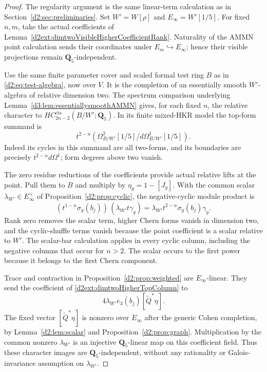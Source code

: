 \begin{proof}
The regularity argument is the same linear-term calculation as in
Section~\ref{d2:sec:preliminaries}.
Set $W'=W[\rho]$ and $E_\infty=W'[1/5]$.
For fixed $n,m$, take the actual coefficients of
Lemma~\ref{d2ext:dimtwoVisibleHigherCoefficientRank}.
Naturality of the AMMN point calculation sends their coordinates
under $E_m\hookrightarrow E_\infty$; hence their visible
projections remain $\mathbf Q_5$-independent.

Use the same finite parameter cover and scaled formal test ring
$B$ as in \eqref{d2:eq:test-algebra}, now over $V$.
It is the completion of an essentially smooth $W'$-algebra
of relative dimension two.  The spectrum comparison underlying
Lemma~\ref{d3:lem:essentiallysmoothAMMN} gives, for each fixed $n$,
the relative character to $HC_{2n-2}^{\mathrm{cts}}(B/W';\mathbf Q_5)$.
In its finite mixed-HKR model the top-form summand is
\begin{equation}
\label{d2ext:dimtwoHigherTopColumn}
 t^{2-n}\left(
 \Omega^2_{B/W'}[1/5]/d\Omega^1_{B/W'}[1/5]\right).
\end{equation}
Indeed its cycles in this summand are all two-forms, and its
boundaries are precisely $t^{2-n}d\Omega^1$; form degrees above
two vanish.

The zero residue reductions of the coefficients provide actual
relative lifts at the point. Pull them to $B$ and multiply by
$\eta_g=1-[J_g]$.
With the common scalar $\lambda_{W'}\in E_\infty^\times$ of
Proposition~\ref{d2:prop:cyclic}, the negative-cyclic module product is
\[
 (t^{1-n}\sigma_g(b_j))\,(\lambda_{W'}t\gamma_g)
       =\lambda_{W'}t^{2-n}\sigma_g(b_j)\gamma_g.
\]
Rank zero removes the scalar term, higher Chern forms vanish in
dimension two, and the cyclic-shuffle terms vanish because the
point coefficient is a scalar relative to $W'$.
The scalar-bar calculation applies in every cyclic column, including
the negative columns that occur for $n>2$.
The scalar occurs to the first power because it belongs to the
first Chern component.

Trace and contraction in Proposition~\ref{d2:prop:weighted} are
$E_\infty$-linear. They send the coefficient of
\eqref{d2ext:dimtwoHigherTopColumn} to
\[
 4\lambda_{W'}e_3(b_j)[\widetilde Q^*\eta].
\]
The fixed vector $[\widetilde Q^*\eta]$ is nonzero over $E_\infty$
after the generic Cohen completion, by
Lemma~\ref{d2:lem:scalar} and Proposition~\ref{d2:prop:graph}.
Multiplication by the common nonzero $\lambda_{W'}$ is an
injective $\mathbf Q_5$-linear map on this coefficient field.
Thus these character images are $\mathbf Q_5$-independent,
without any rationality or Galois-invariance assumption on
$\lambda_{W'}$.


\end{proof}
